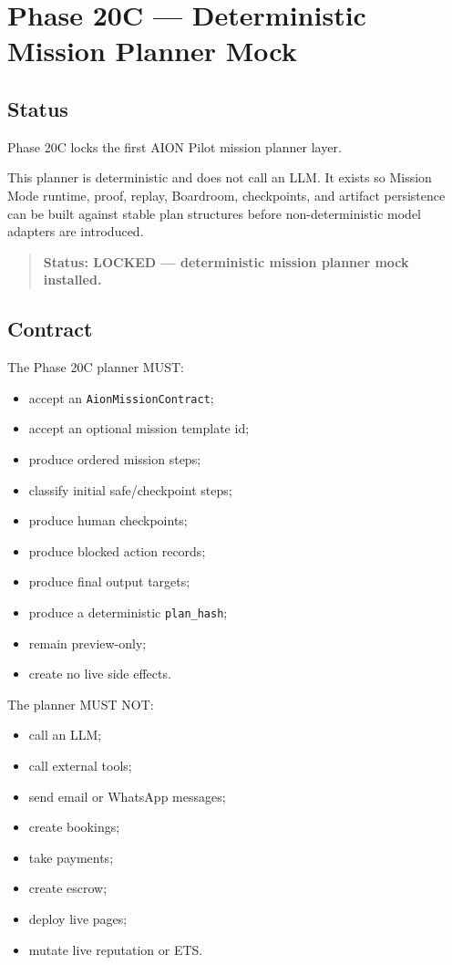 \section{Phase 20C --- Deterministic Mission Planner Mock}
\label{sec:aion-phase20c-mission-planner-lock}

\subsection{Status}

Phase 20C locks the first AION Pilot mission planner layer.

This planner is deterministic and does not call an LLM. It exists so Mission Mode runtime, proof, replay, Boardroom, checkpoints, and artifact persistence can be built against stable plan structures before non-deterministic model adapters are introduced.

\begin{quote}
\textbf{Status: LOCKED --- deterministic mission planner mock installed.}
\end{quote}

\subsection{Contract}

The Phase 20C planner MUST:

\begin{itemize}
  \item accept an \texttt{AionMissionContract};
  \item accept an optional mission template id;
  \item produce ordered mission steps;
  \item classify initial safe/checkpoint steps;
  \item produce human checkpoints;
  \item produce blocked action records;
  \item produce final output targets;
  \item produce a deterministic \texttt{plan\_hash};
  \item remain preview-only;
  \item create no live side effects.
\end{itemize}

The planner MUST NOT:

\begin{itemize}
  \item call an LLM;
  \item call external tools;
  \item send email or WhatsApp messages;
  \item create bookings;
  \item take payments;
  \item create escrow;
  \item deploy live pages;
  \item mutate live reputation or ETS.
\end{itemize}

